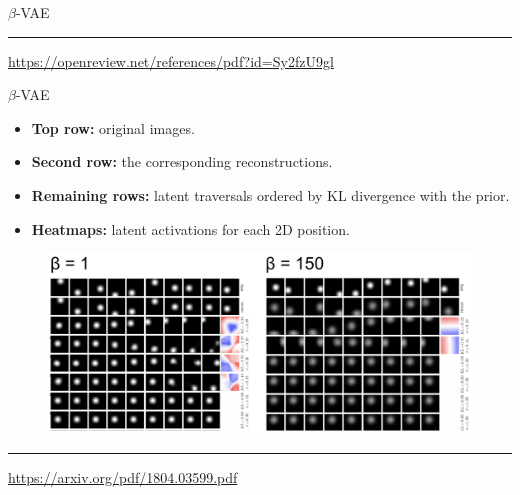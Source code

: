 \documentclass{beamer}
\begin{document}
\begin{frame}{$\beta$-VAE}
\begin{minipage}[t]{0.5\columnwidth}
\begin{figure}[h]
		\end{figure}
	\end{minipage}
\vfill
\hrule\medskip
{\scriptsize \href{https://openreview.net/references/pdf?id=Sy2fzU9gl}{https://openreview.net/references/pdf?id=Sy2fzU9gl}}
\end{frame}
\begin{frame}{$\beta$-VAE}
	\begin{itemize}
		\item \textbf{Top row:} original images.
		\item \textbf{Second row:} the corresponding reconstructions. 
		\item \textbf{Remaining rows:} latent traversals ordered by KL divergence with the prior. 
		\item \textbf{Heatmaps:} latent activations for each 2D position.
	\end{itemize}
\begin{figure}
    \centering
    \includegraphics[width=\linewidth]{figs/betaVAE_6.png}
\end{figure}
\vspace{0.3cm}

\vfill
\hrule\medskip
{\scriptsize \href{https://arxiv.org/pdf/1804.03599.pdf}{https://arxiv.org/pdf/1804.03599.pdf}}
\end{frame}
\end{document}
